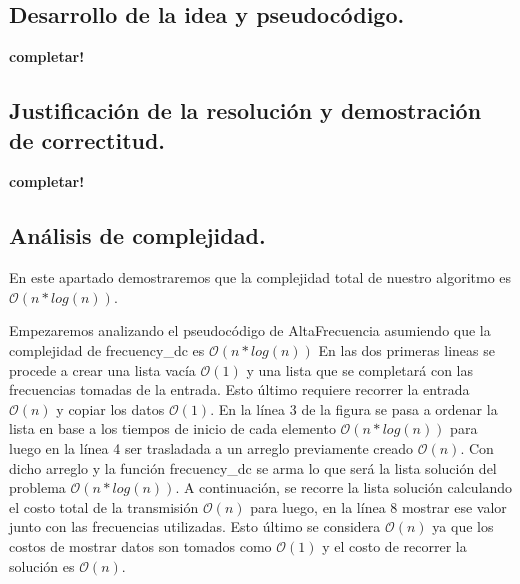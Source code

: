 


\newpage
\subsection{Desarrollo de la idea y pseudocódigo.}

\vspace*{0.3cm}

\textbf{completar!}

\newpage
\subsection{Justificación de la resolución y demostración de correctitud.}

\vspace*{0.3cm}

\textbf{completar!}



\newpage
\subsection{Análisis de complejidad.}

\vspace*{0.3cm}

En este apartado demostraremos que la complejidad total de nuestro algoritmo es $\mathcal{O}(n*log(n))$.

Empezaremos analizando el pseudocódigo de AltaFrecuencia asumiendo que la complejidad de frecuency_dc es $\mathcal{O}(n*log(n))$
En las dos primeras lineas se procede a crear una lista vacía $\mathcal{O}(1)$ y una lista que se completará con las frecuencias tomadas de la entrada. Esto último requiere recorrer la entrada $\mathcal{O}(n)$ y copiar los datos $\mathcal{O}(1)$.
En la línea 3 de la figura se pasa a ordenar la lista en base a los tiempos de inicio de cada elemento $\mathcal{O}(n*log(n))$ para luego en la línea 4 ser trasladada a un arreglo previamente creado $\mathcal{O}(n)$. Con dicho arreglo y la función frecuency_dc se arma lo que será la lista solución del problema $\mathcal{O}(n*log(n))$. A continuación, se recorre la lista solución calculando el costo total de la transmisión $\mathcal{O}(n)$ para luego, en la línea 8 mostrar ese valor junto con las frecuencias utilizadas. Esto último se considera $\mathcal{O}(n)$ ya que los costos de mostrar datos son tomados como $\mathcal{O}(1)$ y el costo de recorrer la solución es $\mathcal{O}(n)$.

